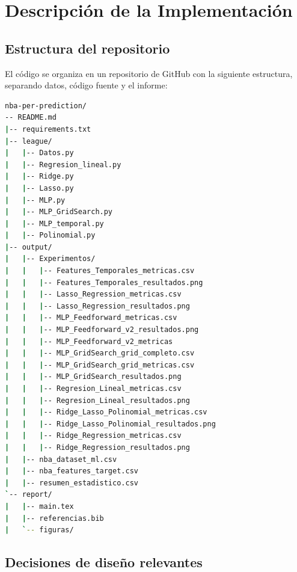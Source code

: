 \documentclass[11pt,a4paper]{article}
\begin{document}
\section{Descripción de la Implementación}

\subsection{Estructura del repositorio}

El código se organiza en un repositorio de GitHub con la siguiente
estructura, separando datos, código fuente y el informe:

\begin{lstlisting}[language=bash, caption={Estructura del repositorio}]
nba-per-prediction/
-- README.md                
|-- requirements.txt    
|-- league/
|   |-- Datos.py
|   |-- Regresion_lineal.py
|   |-- Ridge.py
|   |-- Lasso.py
|   |-- MLP.py
|   |-- MLP_GridSearch.py
|   |-- MLP_temporal.py
|   |-- Polinomial.py
|-- output/
|   |-- Experimentos/
|   |   |-- Features_Temporales_metricas.csv
|   |   |-- Features_Temporales_resultados.png
|   |   |-- Lasso_Regression_metricas.csv
|   |   |-- Lasso_Regression_resultados.png
|   |   |-- MLP_Feedforward_metricas.csv
|   |   |-- MLP_Feedforward_v2_resultados.png
|   |   |-- MLP_Feedforward_v2_metricas
|   |   |-- MLP_GridSearch_grid_completo.csv
|   |   |-- MLP_GridSearch_grid_metricas.csv
|   |   |-- MLP_GridSearch_resultados.png
|   |   |-- Regresion_Lineal_metricas.csv
|   |   |-- Regresion_Lineal_resultados.png
|   |   |-- Ridge_Lasso_Polinomial_metricas.csv
|   |   |-- Ridge_Lasso_Polinomial_resultados.png
|   |   |-- Ridge_Regression_metricas.csv
|   |   |-- Ridge_Regression_resultados.png
|   |-- nba_dataset_ml.csv
|   |-- nba_features_target.csv
|   |-- resumen_estadistico.csv
`-- report/
|   |-- main.tex
|   |-- referencias.bib
|   `-- figuras/
\end{lstlisting}

\subsection{Decisiones de diseño relevantes}
\end{document}
